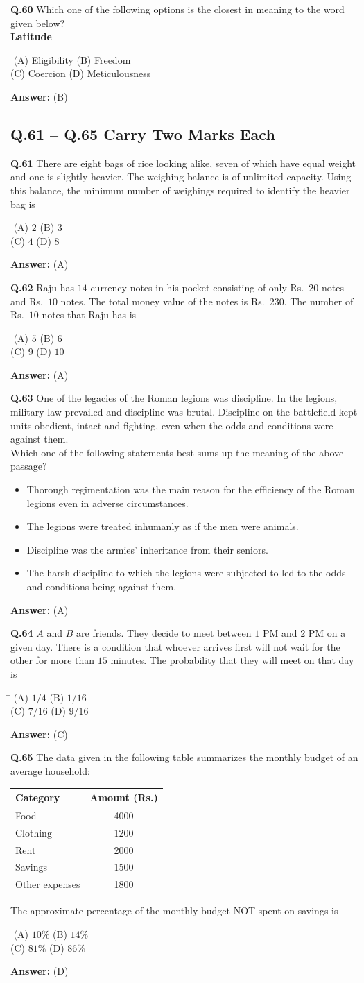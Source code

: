 \documentclass[11pt,a4paper]{article}
\newcommand{\optsfourA}[4]{%
  \begin{tabbing}
    \hspace{0.48\linewidth}\=\kill
    (A) #1 \> (B) #2 \\[2pt]
    (C) #3 \> (D) #4
  \end{tabbing}%
}
\newcommand{\optslistA}[4]{%
  \begin{itemize}
    \setlength{\itemsep}{2pt}\setlength{\parskip}{0pt}
    \item[(A)] #1
    \item[(B)] #2
    \item[(C)] #3
    \item[(D)] #4
  \end{itemize}%
}
\newcommand{\ans}[1]{\textbf{Answer:} #1\par\medskip}
\begin{document}
\textbf{Q.60} Which one of the following options is the closest in meaning to the word given below?\\
\textbf{Latitude}
\optsfourA{Eligibility}{Freedom}{Coercion}{Meticulousness}
\ans{(B)}

\subsection*{Q.61 -- Q.65 Carry Two Marks Each}

\textbf{Q.61} There are eight bags of rice looking alike, seven of which have equal weight and one is slightly heavier. The weighing balance is of unlimited capacity. Using this balance, the minimum number of weighings required to identify the heavier bag is
\optsfourA{$2$}{$3$}{$4$}{$8$}
\ans{(A)}

\textbf{Q.62} Raju has $14$ currency notes in his pocket consisting of only Rs.\ $20$ notes and Rs.\ $10$ notes. The total money value of the notes is Rs.\ $230$. The number of Rs.\ $10$ notes that Raju has is
\optsfourA{$5$}{$6$}{$9$}{$10$}
\ans{(A)}

\textbf{Q.63} One of the legacies of the Roman legions was discipline. In the legions, military law prevailed and discipline was brutal. Discipline on the battlefield kept units obedient, intact and fighting, even when the odds and conditions were against them.\\
Which one of the following statements best sums up the meaning of the above passage?
\optslistA{Thorough regimentation was the main reason for the efficiency of the Roman legions even in adverse circumstances.}{The legions were treated inhumanly as if the men were animals.}{Discipline was the armies' inheritance from their seniors.}{The harsh discipline to which the legions were subjected to led to the odds and conditions being against them.}
\ans{(A)}

\textbf{Q.64} $A$ and $B$ are friends. They decide to meet between $1$ PM and $2$ PM on a given day. There is a condition that whoever arrives first will not wait for the other for more than $15$ minutes. The probability that they will meet on that day is
\optsfourA{$1/4$}{$1/16$}{$7/16$}{$9/16$}
\ans{(C)}

\textbf{Q.65} The data given in the following table summarizes the monthly budget of an average household:
\begin{center}
\begin{tabular}{lc}
  \toprule
  Category & Amount (Rs.) \\
  \midrule
  Food & 4000 \\
  Clothing & 1200 \\
  Rent & 2000 \\
  Savings & 1500 \\
  Other expenses & 1800 \\
  \bottomrule
\end{tabular}
\end{center}
The approximate percentage of the monthly budget NOT spent on savings is
\optsfourA{$10\%$}{$14\%$}{$81\%$}{$86\%$}
\ans{(D)}
\end{document}
